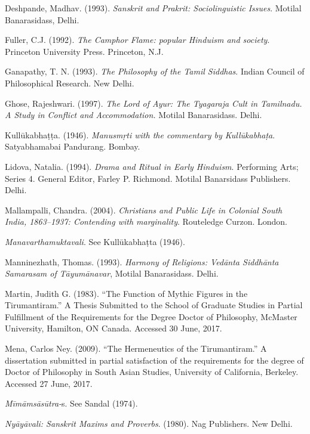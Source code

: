 \begin{thebibliography}{99}
  Deshpande, Madhav. (1993). \textit{Sanskrit and Prakrit: Sociolinguistic Issues}. Motilal Banarasidass, Delhi.

  Fuller, C.J. (1992). \textit{The Camphor Flame: popular Hinduism and society}. Princeton University Press. Princeton, N.J.

  Ganapathy, T. N. (1993). \textit{The Philosophy of the Tamil Siddhas}. Indian Council of Philosophical Research. New Delhi.

  Ghose, Rajeshwari. (1997). \textit{The Lord of Ayur: The Tyagaraja Cult in Tamilnadu. A Study in Conflict and Accommodation.} Motilal Banarasidass. Delhi.

  Kullūkabhaṭṭa. (1946). \textit{Manusmṛti with the commentary by Kullūkabhaṭa}. Satyabhamabai Pandurang. Bombay.
 
  Lidova, Natalia. (1994). \textit{Drama and Ritual in Early Hinduism}. Performing Arts; Series 4. General Editor, Farley P. Richmond. Motilal Banarsidass Publishers. Delhi.

  Mallampalli, Chandra. (2004). \textit{Christians and Public Life in Colonial South India, 1863–1937: Contending with marginality}. Routeledge Curzon. London.

  \textit{Manavarthamuktavali}. See Kullūkabhaṭta (1946).

  Manninezhath, Thomas. (1993). \textit{Harmony of Religions: Vedānta Siddhānta Samarasam of Tāyumānavar}, Motilal Banarasidass. Delhi.

  Martin, Judith G. (1983). “The Function of Mythic Figures in the Tirumantiram.” A Thesis Submitted to the School of Graduate Studies in Partial Fulfillment of the Requirements for the Degree Doctor of Philosophy, McMaster University, Hamilton, ON Canada. Accessed 30 June, 2017.

  Mena, Carlos Ney. (2009). “The Hermeneutics of the Tirumantiram.” A dissertation submitted in partial satisfaction of the requirements for the degree of Doctor of Philosophy in South Asian Studies, University of California, Berkeley. Accessed 27 June, 2017.

  \textit{Mīmāmsāsūtra-}s. See Sandal (1974).

  \textit{Nyāyāvali: Sanskrit Maxims and Proverbs}. (1980). Nag Publishers. New Delhi.


\end{thebibliography}

